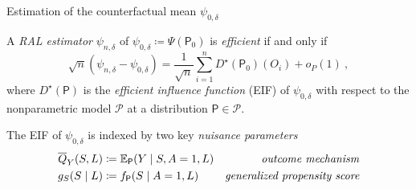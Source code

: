 \documentclass{beamer}
\begin{document}

\begin{frame}{Estimation of the counterfactual mean $\psi_{0,\delta}$}

A \textit{RAL estimator} $\psi_{n,\delta}$ of $\psi_{0,\delta} \coloneqq
\Psi(\mathsf{P}_0)$ is \textit{efficient} if and only if
\[
  \sqrt{n}(\psi_{n,\delta} - \psi_{0, \delta}) = \frac{1}{\sqrt{n}}
  \sum\limits_{i=1}^n D^{\star}(\mathsf{P}_0)(O_i) + o_P(1) \ ,
\]
where $D^{\star}(\mathsf{P})$ is the \textit{efficient influence function} (EIF) of
$\psi_{0,\delta}$ with respect to the nonparametric model $\mathcal{P}$ at a
distribution $\mathsf{P} \in \mathcal{P}$.
\vspace{0.25cm}

The EIF of $\psi_{0,\delta}$ is indexed by two key \textit{nuisance parameters}
\begin{align*}
  \overline{Q}_{Y}(S,L) &\coloneqq \mathbb{E}_{\mathsf{P}}(Y \mid S, A = 1, L) &
      \mbox{\textit{outcome mechanism}} \\
  g_{S}(S \mid L) &\coloneqq f_{\mathsf{P}}(S \mid A = 1, L) &
    \mbox{\textit{generalized propensity score}}
\end{align*}

\note{
}

\end{frame}

\end{document}
